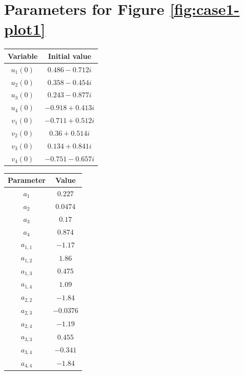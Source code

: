 \documentclass[11pt,a4paper]{article}
\numberwithin{equation}{section}
\begin{document}

\section{Parameters for Figure \ref{fig:case1-plot1}}
\label{app:case1-params}

\noindent
\begin{minipage}[t]{0.48\textwidth}
\centering
{}
\label{tab:case1-init}
\begin{tabular}{c c}
\hline
Variable & Initial value \\
\hline
$u_1(0)$ & $0.486-0.712i$ \\
$u_2(0)$ & $0.358-0.454i$ \\
$u_3(0)$ & $0.243-0.877i$ \\
$u_4(0)$ & $-0.918+0.413i$ \\
$v_1(0)$ & $-0.711+0.512i$ \\
$v_2(0)$ & $0.36+0.514i$ \\
$v_3(0)$ & $0.134+0.841i$ \\
$v_4(0)$ & $-0.751-0.657i$ \\
\hline
\end{tabular}
\end{minipage}
\hfill
\begin{minipage}[t]{0.48\textwidth}
\centering
{}
\label{tab:case1-params}
\begin{tabular}{c c}
\hline
Parameter & Value \\
\hline
$a_1$ & $0.227$ \\
$a_2$ & $0.0474$ \\
$a_3$ & $0.17$ \\
$a_4$ & $0.874$ \\
$a_{1,1}$ & $-1.17$ \\
$a_{1,2}$ & $1.86$ \\
$a_{1,3}$ & $0.475$ \\
$a_{1,4}$ & $1.09$ \\
$a_{2,2}$ & $-1.84$ \\
$a_{2,3}$ & $-0.0376$ \\
$a_{2,4}$ & $-1.19$ \\
$a_{3,3}$ & $0.455$ \\
$a_{3,4}$ & $-0.341$ \\
$a_{4,4}$ & $-1.84$ \\
\hline
\end{tabular}
\end{minipage}
\end{document}
